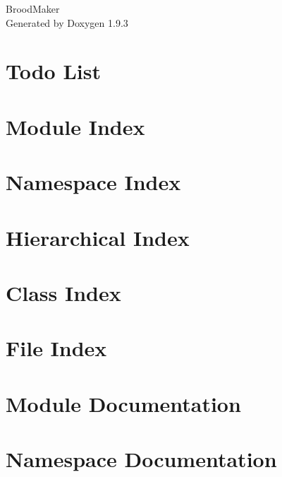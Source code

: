\documentclass[twoside]{book}
\newcommand{\+}{\discretionary{\mbox{\scriptsize$\hookleftarrow$}}{}{}}
\newcommand{\clearemptydoublepage}{%
    \newpage{\pagestyle{empty}\cleardoublepage}%
  }
\begin{document}
  \raggedbottom
    \hypersetup{pageanchor=false,
                bookmarksnumbered=true,
                pdfencoding=unicode
               }
  \begin{titlepage}
  \vspace*{7cm}
  \begin{center}%
  {\Large Brood\+Maker}\\
  \vspace*{1cm}
  {\large Generated by Doxygen 1.9.3}\\
  \end{center}
  \end{titlepage}
  \clearemptydoublepage
  \tableofcontents
  \clearemptydoublepage
  \hypersetup{pageanchor=true}
\chapter{Todo List}
\label{todo}

\chapter{Module Index}

\chapter{Namespace Index}

\chapter{Hierarchical Index}

\chapter{Class Index}

\chapter{File Index}

\chapter{Module Documentation}





\chapter{Namespace Documentation}







\end{document}
